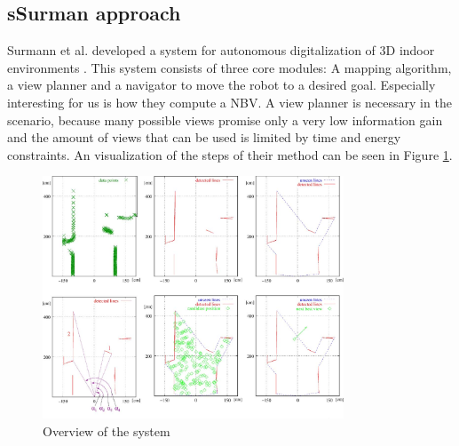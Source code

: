 \documentclass[a4paper,11pt,english]{article}
\begin{document}
\subsection{sSurman approach}
\label{background:surman}
Surmann et al. developed a system for autonomous digitalization of 3D indoor environments \cite{surmann2003autonomous}.
This system consists of three core modules: A mapping algorithm, a view planner and a navigator to move the robot to a desired goal.
Especially interesting for us is how they compute a NBV.
A view planner is necessary in the  scenario, because many possible views promise only a very low information gain and the amount of views that can be used is limited by time and energy constraints.
An visualization of the steps of their method can be seen in Figure \ref{fig:surmann}.

\begin{figure}
	\begin{center}
		\includegraphics[width=0.8\textwidth]{src/nbv.png}
		\caption{Overview of the system}
		\label{fig:surmann}
	\end{center}
\end{figure}
\end{document}
